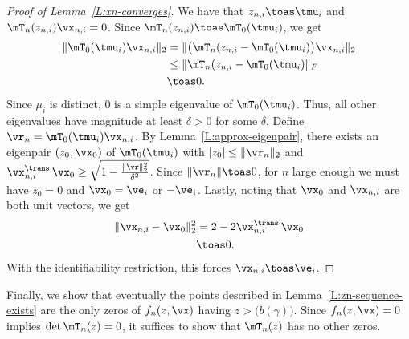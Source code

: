 \begin{proof}[Proof of Lemma~\ref{L:xn-converges}]
    We have that $z_{n,i} \toas \tmu_i$ and 
    $\mT_n(z_{n,i}) \vx_{n,i} = 0$.  Since
    $\mT_n(z_{n,i}) \toas \mT_0(\tmu_i)$, we get
    \begin{align*}
        \| \mT_0(\tmu_i) \vx_{n,i} \|_2
            &= \| \big(\mT_n(z_{n,i} - \mT_0(\tmu_i) \big) \vx_{n,i} \|_2 \\
            &\leq \| \mT_n(z_{n,i} - \mT_0(\tmu_i) \|_F \\
            &\toas 0.
    \end{align*}
    Since $\mu_i$ is distinct, $0$ is a simple eigenvalue of $\mT_0(\tmu_i)$.
    Thus, all other eigenvalues have magnitude at least $\delta > 0$ for some 
    $\delta$.
    Define $\vr_n = \mT_0(\tmu_i) \vx_{n,i}$.  By 
    Lemma~\ref{L:approx-eigenpair}, there exists an eigenpair $(z_0, \vx_0)$
    of $\mT_0(\tmu_i)$ with $| z_0 | \leq \| \vr_n \|_2$ and
    $ \vx_{n,i}^\trans \, \vx_0 \geq
        \sqrt{ 1 - \frac{\|\vr\|_2^2}{ \delta^2 } }$.  Since 
    $\|\vr_n\| \toas 0$, for $n$ large enough we must have $z_0 = 0$ and
    $\vx_0 = \ve_i$ or $-\ve_i$.  Lastly, noting that $\vx_0$ and $\vx_{n,i}$
    are both unit vectors, we get
    \begin{align*}
        \| \vx_{n,i} - \vx_0 \|_2^2
            &= 2 - 2 \vx_{n,i}^\trans \, \vx_0 \\
            &\toas 0.
    \end{align*}
    With the identifiability restriction, this forces $\vx_{n,i} \toas \ve_i$.
\end{proof}

Finally, we show that eventually the points described in Lemma~\ref{L:zn-sequence-exists} are the only zeros of $f_n(z, \vx)$ having
$z > \big( b(\gamma) \big)$.  Since $f_n(z, \vx) = 0$ implies 
$\det \mT_n(z) = 0$, it suffices to show that $\mT_n(z)$ has no other
zeros.

